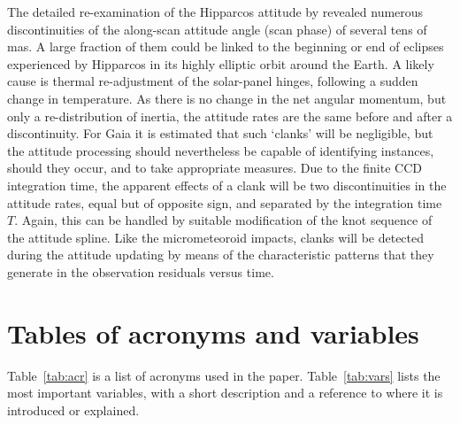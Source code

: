\documentclass[structabstract]{aa}
\begin{document}
The detailed re-examination of the Hipparcos attitude by
\citet{2005A&A...439..805V,book:newhip} revealed numerous discontinuities
of the along-scan attitude angle (scan phase) of several tens of mas. A large
fraction of them could be linked to the beginning or end of eclipses experienced
by Hipparcos in its highly elliptic orbit around the Earth. A likely cause is thermal 
re-adjustment of the solar-panel hinges, following a sudden change in temperature. 
As there is no change in the net angular momentum, but only a re-distribution of
inertia, the attitude rates are the same before and after a discontinuity.
For Gaia it is estimated that such `clanks' will be negligible, but the attitude
processing should nevertheless be capable of identifying instances, should they
occur, and to take appropriate measures. Due to the finite CCD integration time,
the apparent effects of a clank will be two discontinuities in the attitude rates,
equal but of opposite sign, and separated by the integration time $T$.
Again, this can be handled by suitable modification of the knot sequence of
the attitude spline. Like the micrometeoroid impacts, clanks will be detected
during the attitude updating by means of the characteristic patterns that they 
generate in the observation residuals versus time.  


\section{Tables of acronyms and variables}\label{sec:vars}

Table~\ref{tab:acr} is a list of acronyms used in the paper. 
Table~\ref{tab:vars} lists the most important variables, with a short 
description and a reference to where it is introduced or explained.
\end{document}
